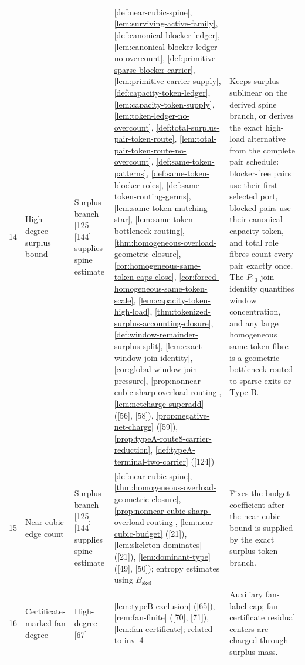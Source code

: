 \documentclass[11pt]{article}
\begin{document}
{\begin{longtable}{C{0.032\textwidth} L{0.145\textwidth} L{0.105\textwidth} L{0.50\textwidth} L{0.155\textwidth}}
14 & High-degree surplus bound & Surplus branch {[125]--[144]} supplies spine estimate & \cref{def:near-cubic-spine}, \cref{lem:surviving-active-family}, \cref{def:canonical-blocker-ledger}, \cref{lem:canonical-blocker-ledger-no-overcount}, \cref{def:primitive-sparse-blocker-carrier}, \cref{lem:primitive-carrier-supply}, \cref{def:capacity-token-ledger}, \cref{lem:capacity-token-supply}, \cref{lem:token-ledger-no-overcount}, \cref{def:total-surplus-pair-token-route}, \cref{lem:total-pair-token-route-no-overcount}, \cref{def:same-token-patterns}, \cref{def:same-token-blocker-roles}, \cref{def:same-token-routing-germs}, \cref{lem:same-token-matching-star}, \cref{lem:same-token-bottleneck-routing}, \cref{thm:homogeneous-overload-geometric-closure}, \cref{cor:homogeneous-same-token-caps-close}, \cref{cor:forced-homogeneous-same-token-scale}, \cref{lem:capacity-token-high-load}, \cref{thm:tokenized-surplus-accounting-closure}, \cref{def:window-remainder-surplus-split}, \cref{lem:exact-window-join-identity}, \cref{cor:global-window-join-pressure}, \cref{prop:nonnear-cubic-sharp-overload-routing}, \cref{lem:netcharge-superadd} ([56], [58]), \cref{prop:negative-net-charge} ([59]), \cref{prop:typeA-route8-carrier-reduction}, \cref{def:typeA-terminal-two-carrier} ([124]) & Keeps surplus sublinear on the derived spine branch, or derives the exact high-load alternative from the complete pair schedule: blocker-free pairs use their first selected port, blocked pairs use their canonical capacity token, and total role fibres count every pair exactly once.  The \(P_{13}\) join identity quantifies window concentration, and any large homogeneous same-token fibre is a geometric bottleneck routed to sparse exits or Type B. \\
15 & Near-cubic edge count & Surplus branch {[125]--[144]} supplies spine estimate & \cref{def:near-cubic-spine}, \cref{thm:homogeneous-overload-geometric-closure}, \cref{prop:nonnear-cubic-sharp-overload-routing}, \cref{lem:near-cubic-budget} ([21]), \cref{lem:skeleton-dominates} ([21]), \cref{lem:dominant-type} ([49], [50]); entropy estimates using $B_{\mathrm{skel}}$ & Fixes the budget coefficient after the near-cubic bound is supplied by the exact surplus-token branch. \\
16 & Certificate-marked fan degree & High-degree {[67]} & \cref{lem:typeB-exclusion} ([65]), \cref{rem:fan-finite} ([70], [71]), \cref{lem:fan-certificate}; related to inv~4 & Auxiliary fan-label cap; fan-certificate residual centers are charged through surplus mass. \\

\end{longtable}}
\end{document}
